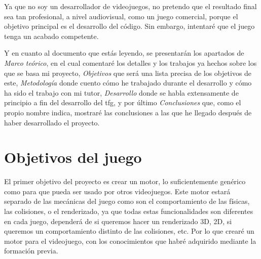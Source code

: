 Ya que no soy un desarrollador de videojuegos, no pretendo que el resultado final sea tan profesional, a nivel audiovisual, como un juego comercial, porque el objetivo principal es el desarrollo del código. Sin embargo, intentaré que el juego tenga un acabado competente. 

Y en cuanto al documento que estás leyendo, se presentarán los apartados de \textit{Marco teórico}, en el cual comentaré los detalles y los trabajos ya hechos sobre los que se basa mi proyecto, \textit{Objetivos} que será una lista precisa de los objetivos de este, \textit{Metodología} donde cuento cómo he trabajado durante el desarrollo y cómo ha sido el trabajo con mi tutor, \textit{Desarrollo} donde se habla extensamente de principio a fin del desarrollo del \gls{tfg}, y por último \textit{Conclusiones} que, como el propio nombre indica, mostraré las conclusiones a las que he llegado después de haber desarrollado el proyecto.

\section{Objetivos del juego}
El primer objetivo del proyecto es crear un motor, lo suficientemente genérico como para que pueda ser usado por otros videojuegos. Este motor estará separado de las mecánicas del juego como son el comportamiento de las físicas, las colisiones, o el renderizado, ya que todas estas funcionalidades son diferentes en cada juego, dependerá de si queremos hacer un renderizado 3D, 2D, si queremos un comportamiento distinto de las colisiones, etc. Por lo que crearé un motor para el videojuego, con los conocimientos que habré adquirido mediante la formación previa.

